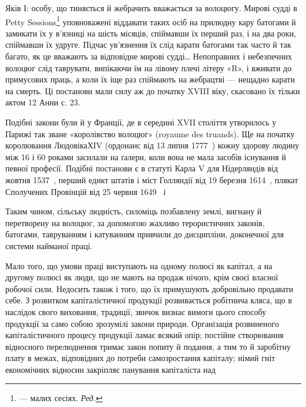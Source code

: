Яків І: особу, що тиняється й жебрачить вважається за волоцюгу.
Мирові судді в Petty Sessions\footnote*{
— малих сесіях. \emph{Ред.}
} уповноважені віддавати
таких осіб на прилюдну кару батогами й замикати їх у в’язниці
на шість місяців, спіймавши їх перший раз, і на два роки, спіймавши
їх удруге. Підчас ув’язнення їх слід карати батогами так часто
й так багато, як це вважають за відповідне мирові судді\dots{} Непоправних
і небезпечних волоцюг слід таврувати, випікаючи
їм на лівому плечі літеру «R», і вживати до примусових праць,
а коли їх іще раз спіймають на жебрацтві — нещадно карати
на смерть. Ці постанови мали силу аж до початку XVIII віку,
скасовано їх тільки актом 12 Анни с. 23.

Подібні закони були й у Франції, де в середині XVII століття
утворилось у Парижі так зване «королівство волоцюг»
(royaume des truands). Ще на початку королювання ЛюдовікаХІV
(ордонанс від 13 липня 1777~) кожну здорову людину між 16 і
60 роками засилали на ґалери, коли вона не мала засобів існування
й певної професії. Подібні постанови є в статуті Карла V
для Нідерляндів від жовтня 1537~, перший едикт штатів і міст
Голляндії від 19 березня 1614~, плякат Сполучених Провінцій
від 25 червня 1649~ і~

Таким чином, сільську людність, силоміць позбавлену землі,
вигнану й перетворену на волоцюг, за допомогою жахливо терористичних
законів, батогами, тавруванням і катуванням привчили
до дисципліни, доконечної для системи найманої праці.

Мало того, що умови праці виступають на одному полюсі як
капітал, а на другому полюсі як люди, що не мають на продаж
нічого, крім своєї власної робочої сили. Недосить також і того,
що їх примушують добровільно продавати себе. З розвитком капіталістичної
продукції розвивається робітнича кляса, що в наслідок
свого виховання, традиції, звичок визнає вимоги цього способу
продукції за само собою зрозумілі закони природи. Організація
розвиненого капіталістичного процесу продукції ламає
всякий опір; постійне створювання відносного перелюднення
тримає закон попиту й подання, а тим то й заробітну плату
в межах, відповідних до потреби самозростання капіталу; німий
гніт економічних відносин закріпляє панування капіталіста над
\parbreak{}  %
